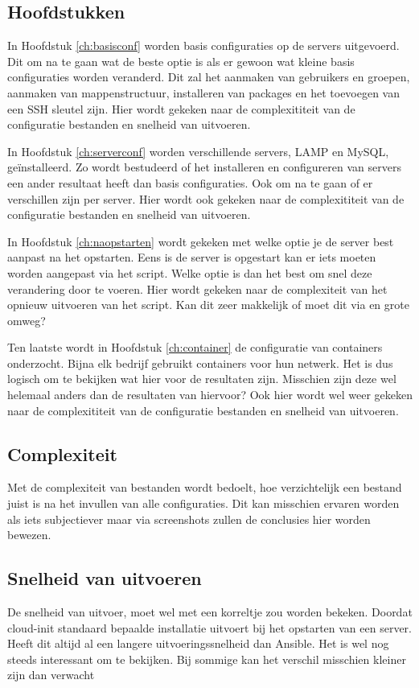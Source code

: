 \subsection{Hoofdstukken}
In Hoofdstuk \ref*{ch:basisconf} worden basis configuraties op de servers uitgevoerd. Dit om na te gaan wat de beste optie is als er gewoon wat kleine basis configuraties worden veranderd. Dit zal het aanmaken van gebruikers en groepen, aanmaken van mappenstructuur, installeren van packages en het toevoegen van een SSH sleutel zijn. Hier wordt gekeken naar de complexititeit van de configuratie bestanden en snelheid van uitvoeren.

In Hoofdstuk \ref*{ch:serverconf} worden verschillende servers, LAMP en MySQL, geïnstalleerd. Zo wordt bestudeerd of het installeren en configureren van servers een ander resultaat heeft dan basis configuraties. Ook om na te gaan of er verschillen zijn per server. Hier wordt ook gekeken naar de complexititeit van de configuratie bestanden en snelheid van uitvoeren.

In Hoofdstuk \ref*{ch:naopstarten} wordt gekeken met welke optie je de server best aanpast na het opstarten. Eens is de server is opgestart kan er iets moeten worden aangepast via het script. Welke optie is dan het best om snel deze verandering door te voeren. Hier wordt gekeken naar de complexiteit van het opnieuw uitvoeren van het script. Kan dit zeer makkelijk of moet dit via en grote omweg?

Ten laatste wordt in Hoofdstuk \ref*{ch:container} de configuratie van containers onderzocht. Bijna elk bedrijf gebruikt containers voor hun netwerk. Het is dus logisch om te bekijken wat hier voor de resultaten zijn. Misschien zijn deze wel helemaal anders dan de resultaten van hiervoor? Ook hier wordt wel weer gekeken naar de complexititeit van de configuratie bestanden en snelheid van uitvoeren.

\subsection{Complexiteit}
Met de complexiteit van bestanden wordt bedoelt, hoe verzichtelijk een bestand juist is na het invullen van alle configuraties. Dit kan misschien ervaren worden als iets subjectiever maar via screenshots zullen de conclusies hier worden bewezen.

\subsection{Snelheid van uitvoeren}
De snelheid van uitvoer, moet wel met een korreltje zou worden bekeken. Doordat cloud-init standaard bepaalde installatie uitvoert bij het opstarten van een server. Heeft dit altijd al een langere uitvoeringssnelheid dan Ansible. Het is wel nog steeds interessant om te bekijken. Bij sommige kan het verschil misschien kleiner zijn dan verwacht


